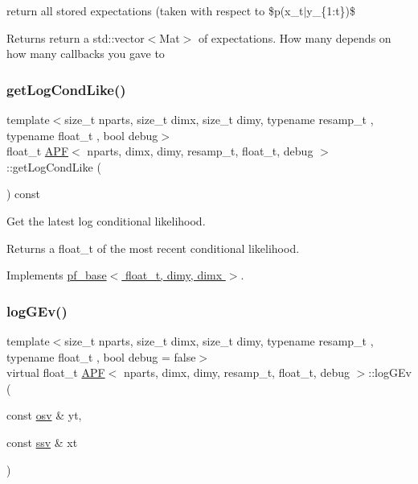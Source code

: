 return all stored expectations (taken with respect to \$p(x\+\_\+t$\vert$y\+\_\+\{1\+:t\})\$ 

\begin{DoxyReturn}{Returns}
return a std\+::vector$<$\+Mat$>$ of expectations. How many depends on how many callbacks you gave to 
\end{DoxyReturn}
\mbox{\label{classAPF_a9f8b62053470fcd2b7541dc3b60dff63}} 
\subsubsection{\texorpdfstring{get\+Log\+Cond\+Like()}{getLogCondLike()}}
{\footnotesize\ttfamily template$<$size\+\_\+t nparts, size\+\_\+t dimx, size\+\_\+t dimy, typename resamp\+\_\+t , typename float\+\_\+t , bool debug$>$ \\
float\+\_\+t \hyperlink{classAPF}{A\+PF}$<$ nparts, dimx, dimy, resamp\+\_\+t, float\+\_\+t, debug $>$\+::get\+Log\+Cond\+Like (\begin{DoxyParamCaption}{ }\end{DoxyParamCaption}) const\hspace{0.3cm}{\ttfamily [virtual]}}



Get the latest log conditional likelihood. 

\begin{DoxyReturn}{Returns}
a float\+\_\+t of the most recent conditional likelihood. 
\end{DoxyReturn}


Implements \hyperlink{classpf__base_a350df818820d6ab0fd6d413022b7f23b}{pf\+\_\+base$<$ float\+\_\+t, dimy, dimx $>$}.

\mbox{\label{classAPF_ae59982358f7fd88203e2fcb86874d64b}} 
\subsubsection{\texorpdfstring{log\+G\+Ev()}{logGEv()}}
{\footnotesize\ttfamily template$<$size\+\_\+t nparts, size\+\_\+t dimx, size\+\_\+t dimy, typename resamp\+\_\+t , typename float\+\_\+t , bool debug = false$>$ \\
virtual float\+\_\+t \hyperlink{classAPF}{A\+PF}$<$ nparts, dimx, dimy, resamp\+\_\+t, float\+\_\+t, debug $>$\+::log\+G\+Ev (\begin{DoxyParamCaption}\item[{const \hyperlink{classAPF_ae4887b3f7121a7509397dd00bffedfe0}{osv} \&}]{yt,  }\item[{const \hyperlink{classAPF_a8b170471292cd6fb5c3c19b55b42fc4e}{ssv} \&}]{xt }\end{DoxyParamCaption})\hspace{0.3cm}{\ttfamily [pure virtual]}}



